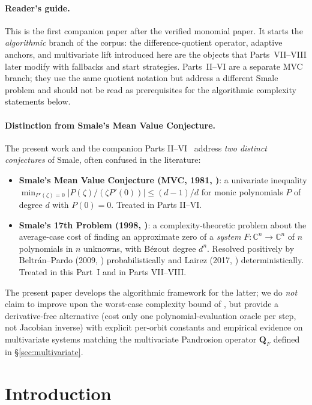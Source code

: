 \documentclass[11pt,a4paper]{article}
\begin{document}
\paragraph{Reader's guide.}
This is the first companion paper after the verified monomial paper. It starts
the \emph{algorithmic} branch of the corpus: the difference-quotient operator,
adaptive anchors, and multivariate lift introduced here are the objects that
Parts~VII--VIII later modify with fallbacks and start strategies. Parts~II--VI
are a separate MVC branch; they use the same quotient notation but address a
different Smale problem and should not be read as prerequisites for the
algorithmic complexity statements below.

\paragraph{Distinction from Smale's Mean Value Conjecture.} The present work and the companion Parts II--VI~\cite{besevic-mvc-series} address \emph{two distinct conjectures} of Smale, often confused in the literature:
\begin{itemize}
\item \textbf{Smale's Mean Value Conjecture (MVC, 1981, \cite{smale1981})}: a univariate inequality $\min_{P'(\zeta) = 0} |P(\zeta)/(\zeta P'(0))| \le (d-1)/d$ for monic polynomials $P$ of degree $d$ with $P(0) = 0$. Treated in Parts II--VI.
\item \textbf{Smale's 17th Problem (1998, \cite{smale1998})}: a complexity-theoretic problem about the average-case cost of finding an approximate zero of a \emph{system} $F: \mathbb{C}^n \to \mathbb{C}^n$ of $n$ polynomials in $n$ unknowns, with B\'ezout degree $d^n$. Resolved positively by Beltr\'an--Pardo (2009, \cite{beltranpardo}) probabilistically and Lairez (2017, \cite{lairez}) deterministically. Treated in this Part~I and in Parts VII--VIII.
\end{itemize}
The present paper develops the algorithmic framework for the latter; we do \emph{not} claim to improve upon the worst-case complexity bound of \cite{lairez}, but provide a derivative-free alternative (cost only one polynomial-evaluation oracle per step, not Jacobian inverse) with explicit per-orbit constants and empirical evidence on multivariate systems matching the multivariate Pandrosion operator $\mathbf{Q}_F$ defined in \S\ref{sec:multivariate}.

\tableofcontents

\section{Introduction}
\end{document}
